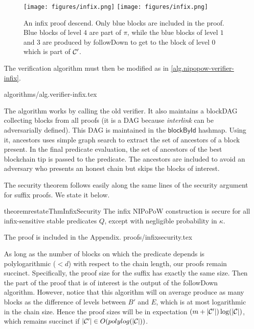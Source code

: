 \begin{figure}[h]
    \caption{An infix proof descend. Only blue blocks are included in the proof.
    Blue blocks of level $4$ are part of $\pi$, while the blue blocks of level
    $1$ and $3$ are produced by followDown to get to the block of level $0$
    which is part of $\mathcal{C}'$.}
    \centering
    \iftwocolumn
        \texttt{[image: figures/infix.png]}
    \else
        \texttt{[image: figures/infix.png]}
    \fi
    \label{fig.infix}
\end{figure}

The verification algorithm must then be modified as in
\ref{alg.nipopow-verifier-infix}.

{algorithms/alg.verifier-infix.tex}

The algorithm works by calling the old verifier. It also maintains a blockDAG
collecting blocks from all proofs (it is a DAG because \textit{interlink} can be
adversarially defined). This DAG is maintained in the $\textsf{blockById}$
hashmap. Using it, \textsf{ancestors} uses simple graph search to extract the
set of ancestors of a block present. In the final predicate evaluation, the set
of ancestors of the best blockchain tip is passed to the predicate. The
ancestors are included to avoid an adversary who presents an honest chain but
skips the blocks of interest.


\medskip

 The security theorem follows easily along
the same lines of the security argument for suffix proofs. We state it below. 
\begin{restatable}{theorem}{restateThmInfixSecurity}
The infix NIPoPoW construction is secure for all infix-sensitive stable
predicates $Q$, except with negligible probability in $\kappa$.
\end{restatable}

The proof is included in the Appendix.
\ifonecolumn
{proofs/infixsecurity.tex}
\fi

As long as the number of blocks on which the predicate depends is
polylogarithmic ($< d$) with respect to the chain length, our proofs remain
succinct. Specifically, the proof size for the suffix has exactly the same size.
Then the part of the proof that is of interest is the output of the followDown
algorithm. However, notice that this algorithm will on average produce as many
blocks as the difference of levels between $B'$ and $E$, which is at most
logarithmic in the chain size. Hence the proof sizes will be in expectation $(m +
|\mathcal{C}'|)\log(|\mathcal{C}|)$, which remains succinct if $|\mathcal{C}'| \in
O(polylog(|\mathcal{C}|))$.
